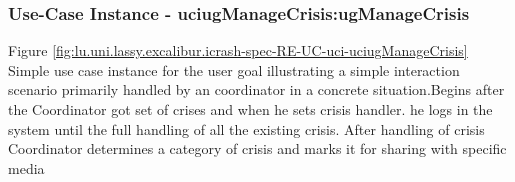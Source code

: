 
	\subsubsection{Use-Case Instance - uciugManageCrisis:ugManageCrisis}
	

	
	Figure \ref{fig:lu.uni.lassy.excalibur.icrash-spec-RE-UC-uci-uciugManageCrisis}
	Simple use case instance for the user goal  illustrating a simple interaction scenario primarily handled by an coordinator in a concrete situation.Begins after the Coordinator got set of crises and when he sets crisis handler. he logs in the system until the full handling of all the existing crisis. After handling of crisis Coordinator determines a category of crisis and marks it for sharing with specific media
	
